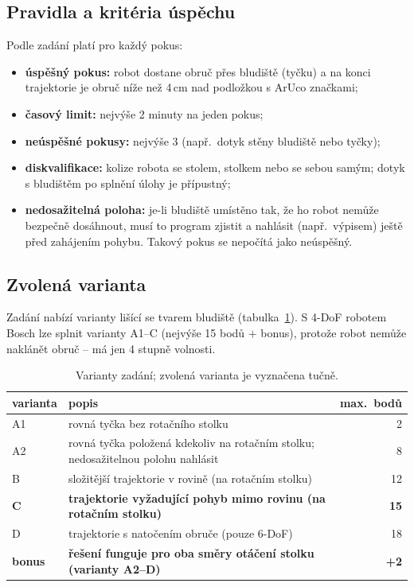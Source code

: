 \documentclass[11pt,a4paper]{article}
\begin{document}
\subsection{Pravidla a kritéria úspěchu}

Podle zadání platí pro každý pokus:
\begin{itemize}
  \item \textbf{úspěšný pokus:} robot dostane obruč přes bludiště (tyčku) a na konci
        trajektorie je obruč níže než 4\,cm nad podložkou s ArUco značkami;
  \item \textbf{časový limit:} nejvýše 2 minuty na jeden pokus;
  \item \textbf{neúspěšné pokusy:} nejvýše 3 (např.\ dotyk stěny bludiště nebo tyčky);
  \item \textbf{diskvalifikace:} kolize robota se stolem, stolkem nebo se sebou samým;
        dotyk s bludištěm po splnění úlohy je přípustný;
  \item \textbf{nedosažitelná poloha:} je-li bludiště umístěno tak, že ho robot nemůže
        bezpečně dosáhnout, musí to program zjistit a nahlásit (např.\ výpisem) ještě před
        zahájením pohybu. Takový pokus se nepočítá jako neúspěšný.
\end{itemize}

\subsection{Zvolená varianta}

Zadání nabízí varianty lišící se tvarem bludiště (tabulka~\ref{tab:varianty}). S 4-DoF
robotem Bosch lze splnit varianty A1--C (nejvýše 15 bodů $+$ bonus), protože robot nemůže
naklánět obruč -- má jen 4 stupně volnosti.

\begin{table}[ht]
\centering
\begin{tabularx}{\linewidth}{@{}l X r@{}}
\toprule
varianta & popis & max.\ bodů \\
\midrule
A1 & rovná tyčka bez rotačního stolku & 2 \\
A2 & rovná tyčka položená kdekoliv na rotačním stolku; nedosažitelnou polohu nahlásit & 8 \\
B  & složitější trajektorie v rovině (na rotačním stolku) & 12 \\
\textbf{C} & \textbf{trajektorie vyžadující pohyb mimo rovinu (na rotačním stolku)} & \textbf{15} \\
D  & trajektorie s natočením obruče (pouze 6-DoF) & 18 \\
\textbf{bonus} & \textbf{řešení funguje pro oba směry otáčení stolku (varianty A2--D)} & \textbf{+2} \\
\bottomrule
\end{tabularx}
\caption{Varianty zadání; zvolená varianta je vyznačena tučně.}
\label{tab:varianty}
\end{table}
\end{document}
